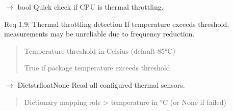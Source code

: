\documentclass[letterpaper,10pt,english]{sphinxmanual}
\begin{document}
\begin{fulllineitems}
\begin{fulllineitems}
\label{\detokenize{core.readers.sensor_reader:core.readers.sensor_reader.SensorReader.is_throttling}}
\pysigstartsignatures
\pysiglinewithargsret
{}
{}
{{ $\rightarrow$ bool}}
\pysigstopsignatures
\sphinxAtStartPar
Quick check if CPU is thermal throttling.

\sphinxAtStartPar
Req 1.9: Thermal throttling detection \sphinxhyphen{} If temperature exceeds
threshold, measurements may be unreliable due to frequency reduction.
\begin{quote}\begin{description}
\sphinxAtStartPar
{} \textendash{} Temperature threshold in Celsius (default 85°C)

\sphinxAtStartPar
True if package temperature exceeds threshold

\end{description}\end{quote}

\end{fulllineitems}


\begin{fulllineitems}
\label{\detokenize{core.readers.sensor_reader:core.readers.sensor_reader.SensorReader.read_all_thermal}}
\pysigstartsignatures
\pysiglinewithargsret
{}
{}
{{ $\rightarrow$ Dict\DUrole{p}{{[}}strfloatNone\DUrole{p}{{]}}}}
\pysigstopsignatures
\sphinxAtStartPar
Read all configured thermal sensors.
\begin{quote}\begin{description}
\sphinxAtStartPar
Dictionary mapping role \sphinxhyphen{}\textgreater{} temperature in °C (or None if failed)

\end{description}\end{quote}

\end{fulllineitems}


\end{fulllineitems}
\end{document}
